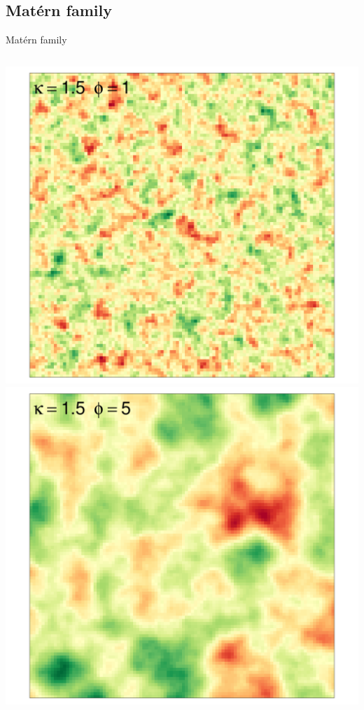 \documentclass[
  ignorenonframetext,
]{beamer}
\begin{document}
\hypertarget{matuxe9rn-family-3}{%
\subsection{Matérn family}\label{matuxe9rn-family-3}}

\begin{frame}{Matérn family}
\small

\begin{columns}[T]
\begin{column}{0.33\textwidth}
\includegraphics{Lecture_1_files/figure-beamer/unnamed-chunk-32-1.pdf}
\includegraphics{Lecture_1_files/figure-beamer/unnamed-chunk-33-1.pdf}
\end{column}


\end{columns}
\end{frame}
\end{document}
